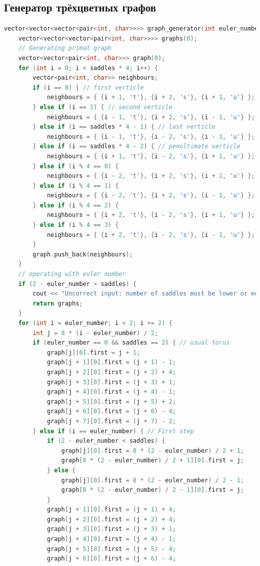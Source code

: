 \subsection{Генератор трёхцветных графов}
\begin{lstlisting}[language=C++]
vector<vector<vector<pair<int, char>>>> graph_generator(int euler_number, int saddles) {
	vector<vector<vector<pair<int, char>>>> graphs(0);
	// Generating primal graph
	vector<vector<pair<int, char>>> graph(0);
	for (int i = 0; i < saddles * 4; i++) {
		vector<pair<int, char>> neighbours;
		if (i == 0) { // first verticle
			neighbours = { {i + 1, 't'}, {i + 2, 's'}, {i + 1, 'u'} };
		} else if (i == 1) { // second verticle
			neighbours = { {i - 1, 't'}, {i + 2, 's'}, {i - 1, 'u'} };
		} else if (i == saddles * 4 - 1) { // last verticle
			neighbours = { {i - 1, 't'}, {i - 2, 's'}, {i - 1, 'u'} };
		} else if (i == saddles * 4 - 2) { // penultimate verticle
			neighbours = { {i + 1, 't'}, {i - 2, 's'}, {i + 1, 'u'} };
		} else if (i % 4 == 0) {
			neighbours = { {i - 2, 't'}, {i + 2, 's'}, {i + 1, 'u'} };
		} else if (i % 4 == 1) {
			neighbours = { {i - 2, 't'}, {i + 2, 's'}, {i - 1, 'u'} };
		} else if (i % 4 == 2) {
			neighbours = { {i + 2, 't'}, {i - 2, 's'}, {i + 1, 'u'} };
		} else if (i % 4 == 3) {
			neighbours = { {i + 2, 't'}, {i - 2, 's'}, {i - 1, 'u'} };
		}
		graph.push_back(neighbours);
	}
	// operating with euler number
	if (2 - euler_number > saddles) {
		cout << "Uncorrect input: number of saddles must be lower or equal than (2 - euler_number)\n";
		return graphs;
	}
	for (int i = euler_number; i < 2; i += 2) {
		int j = 8 * (i - euler_number) / 2;
		if (euler_number == 0 && saddles == 2) { // usual torus
			graph[j][0].first = j + 1;
			graph[j + 1][0].first = (j + 1) - 1;
			graph[j + 2][0].first = (j + 2) + 4;
			graph[j + 3][0].first = (j + 3) + 1;
			graph[j + 4][0].first = (j + 4) - 1;
			graph[j + 5][0].first = (j + 5) + 2;
			graph[j + 6][0].first = (j + 6) - 4;
			graph[j + 7][0].first = (j + 7) - 2;
		} else if (i == euler_number) { // First step
			if (2 - euler_number < saddles) {
				graph[j][0].first = 8 * (2 - euler_number) / 2 + 1;
				graph[8 * (2 - euler_number) / 2 + 1][0].first = j;
			} else {
				graph[j][0].first = 8 * (2 - euler_number) / 2 - 1;
				graph[8 * (2 - euler_number) / 2 - 1][0].first = j;
			}
			graph[j + 1][0].first = (j + 1) + 4;
			graph[j + 2][0].first = (j + 2) + 4;
			graph[j + 3][0].first = (j + 3) + 1;
			graph[j + 4][0].first = (j + 4) - 1;
			graph[j + 5][0].first = (j + 5) - 4;
			graph[j + 6][0].first = (j + 6) - 4;

\end{lstlisting}
